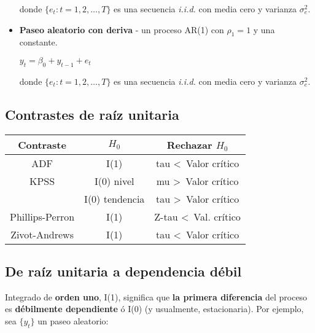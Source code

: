 \documentclass[10pt, a4paper, landscape]{article}
\begin{document}
\begin{multicols}{3}
\begin{itemize}[leftmargin=*]
			donde $\lbrace e_{t} : t = 1, 2, \ldots, T \rbrace$ es una secuencia \textsl{i.i.d.} con media cero y varianza $\sigma^{2}_{e}$.
			
			\item \textbf{Paseo aleatorio con deriva} - un proceso AR(1) con $\rho_{1} = 1$ y una constante.
			
			\begin{center}
				$y_{t} = \beta_{0} + y_{t - 1} + e_{t}$
			\end{center}
			
			donde $\lbrace e_{t} : t = 1, 2, \ldots, T \rbrace$ es una secuencia \textsl{i.i.d.} con media cero y varianza $\sigma^{2}_{e}$.
		\end{itemize}
		
		\subsection*{Contrastes de raíz unitaria}
		
		\begin{center}
			\begin{tabular}{| c | c | c |}
				\hline
				\textbf{Contraste} & $H_{0}$        & \textbf{Rechazar} $H_{0}$         \\ \hline
				ADF                & I(1)           & tau \textless \, Valor crítico    \\ \hline
				KPSS               & I(0) nivel     & mu \textgreater \, Valor crítico  \\
				                   & I(0) tendencia & tau \textgreater \, Valor crítico \\ \hline
				Phillips-Perron    & I(1)           & Z-tau \textless \, Val. crítico   \\ \hline
				Zivot-Andrews      & I(1)           & tau \textless \, Valor crítico    \\ \hline
			\end{tabular}
		\end{center}
		
		\subsection*{De raíz unitaria a dependencia débil}
		
		Integrado de \textbf{orden uno}, I(1), significa que \textbf{la primera diferencia} del proceso es \textbf{débilmente dependiente} ó I(0) (y usualmente, estacionaria). Por ejemplo, sea $\lbrace y_{t} \rbrace$ un paseo aleatorio:
		

\end{multicols}
\end{document}
